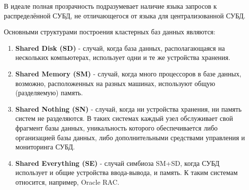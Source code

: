 В идеале полная прозрачность подразумевает наличие языка запросов к распределённой СУБД, не отличающегося от языка для централизованной СУБД.

\bigskip
Основными структурами построения кластерных баз данных являются:
\begin{enumerate}
	\item \textbf{Shared Disk (SD)} - случай, когда база данных, располагающаяся на нескольких компьютерах, использует одни и те же устройства хранения.
	
	\item \textbf{Shared Memory (SM)} - случай, когда много процессоров в базе данных, возможно, расположенных на разных машинах, используют общую (разделяемую) память.
	
	\item \textbf{Shared Nothing (SN)} - случай, когда ни устройства хранения, ни память систем не разделяются. В таких системах каждый узел обслуживает свой фрагмент базы данных, уникальность которого обеспечивается либо организацией базы данных, либо дополнительными средствами управления и мониторинга СУБД.
	
	\item \textbf{Shared Everything (SE)} - случай симбиоза SM+SD, когда СУБД использует и общие устройства ввода-вывода, и память. К таким системам относится, например, Oracle RAC.
\end{enumerate}

